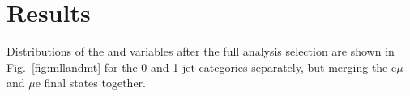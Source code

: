 \section{Results}\label{chap5:results}

Distributions of the \mll and \mt variables after the full analysis selection are shown in Fig.~\ref{fig:mllandmt} for the 0 and 1 jet categories separately, but merging the e$\mu$ and $\mu$e final states together.

\begin{figure}
\centering
{}
\\
\end{figure}
